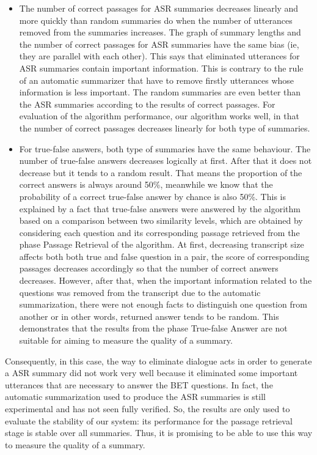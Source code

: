 \begin{itemize}
\item {The number of correct passages for ASR summaries decreases linearly and more quickly than random summaries do when the number of utterances removed from the summaries increases. The graph of summary lengths and the number of correct passages for ASR summaries have the same bias (ie, they are parallel with each other). This says that eliminated utterances for ASR summaries contain important information. This is contrary to the rule of an automatic summarizer that have to remove firstly utterances whose information is less important. The random summaries are even better than the ASR summaries according to the results of correct passages. For evaluation of the algorithm performance, our algorithm works well, in that the number of correct passages decreases linearly for both type of summaries. }
\item {For true-false answers, both type of summaries have the same behaviour. The number of true-false answers decreases logically at first. After that it does not decrease but it tends to a random result. That means the proportion of the correct answers is always around 50\%, meanwhile we know that the probability of a correct true-false answer by chance is also 50\%. This is explained by a fact that true-false answers were answered by the algorithm based on a comparison between two similarity levels, which are obtained by considering each question and its corresponding passage retrieved from the phase Passage Retrieval of the algorithm. At first, decreasing transcript size affects both both true and false question in a pair, the score of corresponding passages decreases accordingly so that the number of correct answers decreases. However, after that, when the important information related to the questions was removed from the transcript due to the automatic summarization, there were not enough facts to distinguish one question from another or in other words, returned answer tends to be random. This demonstrates that the results from the phase True-false Answer are not suitable for aiming to measure the quality of a summary.}

\end{itemize}

Consequently, in this case, the way to eliminate dialogue acts in order to generate a ASR summary did not work very well because it eliminated some important utterances that are necessary to answer the BET questions. In fact, the automatic summarization used to produce the ASR summaries is still experimental and has not seen fully verified. So, the results are only used to evaluate the stability of our system: its performance for the passage retrieval stage is stable over all summaries. Thus, it is promising to be able to use this way to measure the quality of a summary. 




